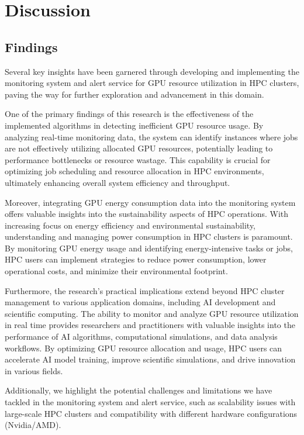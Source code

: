 \chapter{Discussion}
\section{Findings}
Several key insights have been garnered through developing and implementing the monitoring system and alert service for GPU resource utilization in HPC clusters, paving the way for further exploration and advancement in this domain.

One of the primary findings of this research is the effectiveness of the implemented algorithms in detecting inefficient GPU resource usage. By analyzing real-time monitoring data, the system can identify instances where jobs are not effectively utilizing allocated GPU resources, potentially leading to performance bottlenecks or resource wastage. This capability is crucial for optimizing job scheduling and resource allocation in HPC environments, ultimately enhancing overall system efficiency and throughput.

Moreover, integrating GPU energy consumption data into the monitoring system offers valuable insights into the sustainability aspects of HPC operations. With increasing focus on energy efficiency and environmental sustainability, understanding and managing power consumption in HPC clusters is paramount. By monitoring GPU energy usage and identifying energy-intensive tasks or jobs, HPC users can implement strategies to reduce power consumption, lower operational costs, and minimize their environmental footprint.

Furthermore, the research's practical implications extend beyond HPC cluster management to various application domains, including AI development and scientific computing. The ability to monitor and analyze GPU resource utilization in real time provides researchers and practitioners with valuable insights into the performance of AI algorithms, computational simulations, and data analysis workflows. By optimizing GPU resource allocation and usage, HPC users can accelerate AI model training, improve scientific simulations, and drive innovation in various fields.

Additionally, we highlight the potential challenges and limitations we have tackled in the monitoring system and alert service, such as scalability issues with large-scale HPC clusters and compatibility with different hardware configurations (Nvidia/AMD).

